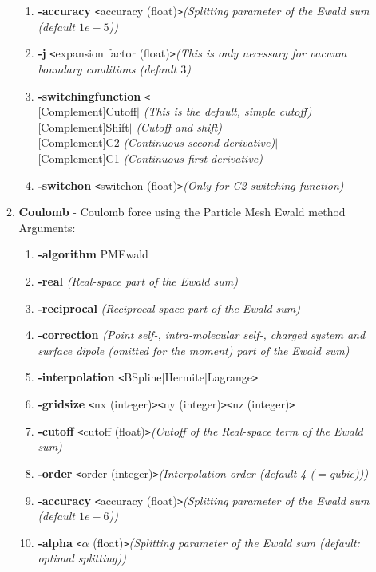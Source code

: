 \documentclass[11pt]{report}
\newcommand{\tempstart}{\texttt{<}}
\newcommand{\tempend}{\texttt{>}}
\begin{document}
\begin{enumerate}
\begin{enumerate}
\begin{enumerate}
    \item {\bf -accuracy} \tempstart accuracy  (float)\tempend  {\it (Splitting parameter of the Ewald sum (default $1e-5$))}
    \item {\bf -j} \tempstart expansion   factor (float)\tempend  {\it (This is only necessary for vacuum boundary conditions (default $3$)}
    \item {\bf -switchingfunction} \tempstart \\
      $[$Complement$]$Cutoff$|$ {\it (This is the default, simple cutoff)}\\
      $[$Complement$]$Shift$|$ {\it (Cutoff and shift)} \\
      $[$Complement$]$C2 {\it (Continuous second derivative)}$|$\\
      $[$Complement$]$C1 {\it (Continuous first derivative)}
    \item {\bf -switchon} \tempstart switchon (float)\tempend  {\it (Only for C2 switching function)}
    \end{enumerate}
  \item {\bf Coulomb} - Coulomb force using the Particle Mesh Ewald method\\
    Arguments:
    \begin{enumerate}
    \item {\bf -algorithm} PMEwald
    \item {\bf -real} {\it (Real-space part of the Ewald sum)}
    \item {\bf -reciprocal} {\it (Reciprocal-space part of the Ewald sum)}
    \item {\bf -correction} {\it (Point self-, intra-molecular self-, charged system and surface dipole (omitted for the  moment) part of the Ewald sum)}
    \item {\bf -interpolation } \tempstart BSpline$|$Hermite$|$Lagrange\tempend  
    \item {\bf -gridsize} \tempstart nx (integer)\tempend  \tempstart ny (integer)\tempend  \tempstart nz (integer)\tempend  
    \item {\bf -cutoff} \tempstart cutoff (float)\tempend   {\it (Cutoff of the Real-space term of the Ewald sum)}
    \item {\bf -order} \tempstart order (integer)\tempend  {\it (Interpolation order (default 4 ($=$qubic)))}
    \item {\bf -accuracy} \tempstart accuracy (float)\tempend  {\it (Splitting parameter of the Ewald sum (default $1e-6$))}
    \item {\bf -alpha} \tempstart $\alpha$ (float)\tempend  {\it (Splitting parameter of the Ewald sum (default: optimal splitting))}

\end{enumerate}
\end{enumerate}
\end{enumerate}
\end{document}
